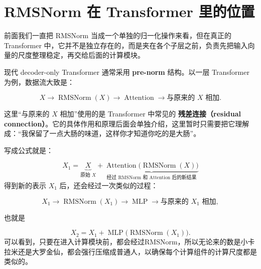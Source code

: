 \documentclass[UTF8,11pt,a4paper]{ctexart}
\begin{document}
\section{RMSNorm 在 Transformer 里的位置}

前面我们一直把 RMSNorm 当成一个单独的归一化操作来看，但在真正的 Transformer 中，它并不是独立存在的，而是夹在各个子层之前，负责先把输入向量的尺度整理稳定，再交给后面的计算模块。

现代 decoder-only Transformer 通常采用 \textbf{pre-norm} 结构。以一层 Transformer 为例，数据流大致是：

\[
X
\longrightarrow
\operatorname{RMSNorm}(X)
\longrightarrow
\operatorname{Attention}
\longrightarrow
\text{与原来的 }X\text{ 相加}.
\]

这里“与原来的 $X$ 相加”使用的是 Transformer 中常见的
\textbf{残差连接（residual connection）}。它的具体作用和原理后面会单独介绍，这里暂时只需要把它理解成：“我保留了一点大肠的味道，这样你才知道你吃的是大肠”。

写成公式就是：

\[
X_1
=
\underbrace{X}_{\text{原始 }X}
+
\underbrace{
\operatorname{Attention}
\bigl(\operatorname{RMSNorm}(X)\bigr)
}_{\text{经过 RMSNorm 和 Attention 后的新结果}}
\]
得到新的表示 $X_1$ 后，还会经过一次类似的过程：

\[
X_1
\longrightarrow
\operatorname{RMSNorm}(X_1)
\longrightarrow
\operatorname{MLP}
\longrightarrow
\text{与原来的 }X_1\text{ 相加},
\]

也就是

\[
X_2
=
X_1
+
\operatorname{MLP}
\bigl(\operatorname{RMSNorm}(X_1)\bigr).
\]
可以看到，只要在进入计算模块前，都会经过RMSNorm，所以无论来的数是小卡拉米还是大罗金仙，都会强行压缩成普通人，以确保每个计算组件的计算尺度都是类似的。
\end{document}
